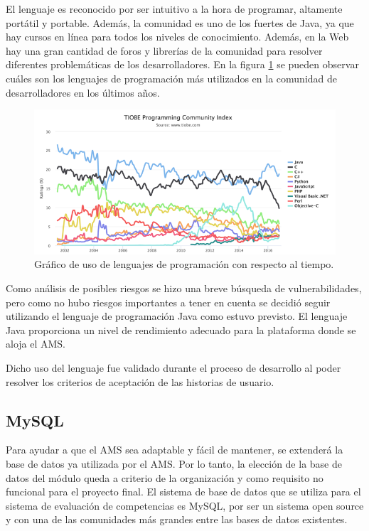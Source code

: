 El lenguaje es reconocido por ser intuitivo a la hora de programar, altamente portátil y portable. Además, la comunidad es uno de los fuertes de Java, ya que hay cursos en línea para todos los niveles de conocimiento. Además, en la Web hay una gran cantidad de foros y librerías de la comunidad para resolver diferentes problemáticas de los desarrolladores. En la figura \ref{graph_java} se pueden observar cuáles son los lenguajes de programación más utilizados en la comunidad de desarrolladores en los últimos años.

\begin{figure}[H]
\centering
\includegraphics[width=125mm,scale=1]{Figuras/tecnologias/java}
\caption{Gráfico de uso de lenguajes de programación con respecto al tiempo.}
  \label{graph_java}
\end{figure}

Como análisis de posibles riesgos se hizo una breve búsqueda de vulnerabilidades, pero como no hubo riesgos importantes a tener en cuenta se decidió seguir utilizando el lenguaje de programación Java como estuvo previsto. El lenguaje Java proporciona un nivel de rendimiento adecuado para la plataforma donde se aloja el AMS.

Dicho uso del lenguaje fue validado durante el proceso de desarrollo al poder resolver los criterios de aceptación de las historias de usuario.

\subsection{MySQL}
Para ayudar a que el AMS sea adaptable y fácil de mantener, se extenderá la base de datos ya utilizada por el AMS. Por lo tanto, la elección de la base de datos del módulo queda a criterio de la organización y como requisito no funcional para el proyecto final. El sistema de base de datos que se utiliza para el sistema de evaluación de competencias es MySQL, por ser un sistema open source y con una de las comunidades más grandes entre las bases de datos existentes.

